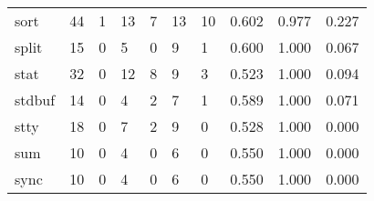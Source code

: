\begin{longtable}{lp{1.3cm}p{1.3cm}p{1.3cm}p{1.3cm}p{1.3cm}p{1.3cm}p{1.3cm}p{1.3cm}p{1.3cm}}
sort      &                     44 &                                             1 &                                           13 &                                           7 &                                           13 &                                         10 &                                0.602 &                                  0.977 &                                0.227 \\
split     &                     15 &                                             0 &                                            5 &                                           0 &                                            9 &                                          1 &                                0.600 &                                  1.000 &                                0.067 \\
stat      &                     32 &                                             0 &                                           12 &                                           8 &                                            9 &                                          3 &                                0.523 &                                  1.000 &                                0.094 \\
stdbuf    &                     14 &                                             0 &                                            4 &                                           2 &                                            7 &                                          1 &                                0.589 &                                  1.000 &                                0.071 \\
stty      &                     18 &                                             0 &                                            7 &                                           2 &                                            9 &                                          0 &                                0.528 &                                  1.000 &                                0.000 \\
sum       &                     10 &                                             0 &                                            4 &                                           0 &                                            6 &                                          0 &                                0.550 &                                  1.000 &                                0.000 \\
sync      &                     10 &                                             0 &                                            4 &                                           0 &                                            6 &                                          0 &                                0.550 &                                  1.000 &                                0.000 \\

\end{longtable}
